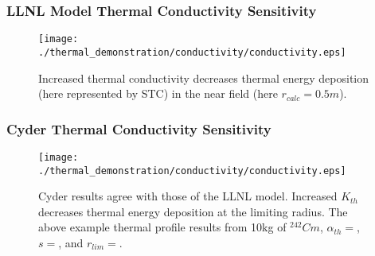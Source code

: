 

\begin{frame}[ctb!]
\frametitle{LLNL Model Thermal Conductivity Sensitivity}

\begin{figure}[htbp!]
\begin{center}
\texttt{[image: ./thermal\_demonstration/conductivity/conductivity.eps]}
\end{center}
\caption[$K_{th}$ Sensitivity in LLNL Model]{Increased thermal conductivity decreases thermal energy deposition 
(here represented by STC) in the near field (here $r_{calc} = 0.5m$).}
\label{fig:Cm242Kth_alpha_low}
\end{figure}

\end{frame}


\begin{frame}[ctb!]
\frametitle{Cyder Thermal Conductivity Sensitivity}
\begin{figure}[htbp!]
\begin{center}
\texttt{[image: ./thermal\_demonstration/conductivity/conductivity.eps]}
\end{center}
\caption[$K_{th}$ Sensitivity in Cyder]
{Cyder results agree with those of the LLNL model. Increased $K_{th}$ decreases 
thermal energy deposition at the limiting radius. The above example thermal 
profile results from 10kg of $^{242}Cm$, $\alpha_{th}=$, $s=$, and $r_{lim}=$.}
\label{fig:kr}
\end{figure}
\end{frame}



